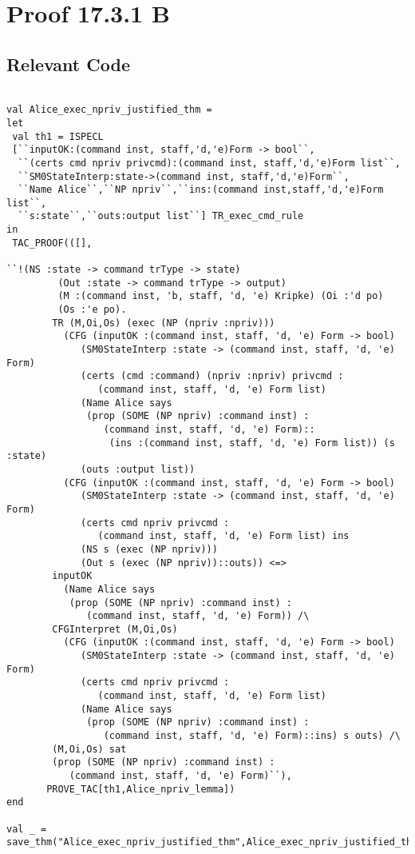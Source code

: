 \documentclass{report}
\begin{document}
\section{Proof 17.3.1 B}
\label{proof-2}

\subsection{Relevant Code}
\label{rel-code-2}
\begin{lstlisting}[frame=TBlr]

val Alice_exec_npriv_justified_thm =
let
 val th1 = ISPECL
 [``inputOK:(command inst, staff,'d,'e)Form -> bool``,
  ``(certs cmd npriv privcmd):(command inst, staff,'d,'e)Form list``,
  ``SM0StateInterp:state->(command inst, staff,'d,'e)Form``,
  ``Name Alice``,``NP npriv``,``ins:(command inst,staff,'d,'e)Form list``,
  ``s:state``,``outs:output list``] TR_exec_cmd_rule
in
 TAC_PROOF(([],

``!(NS :state -> command trType -> state)
         (Out :state -> command trType -> output)
         (M :(command inst, 'b, staff, 'd, 'e) Kripke) (Oi :'d po)
         (Os :'e po).
        TR (M,Oi,Os) (exec (NP (npriv :npriv)))
          (CFG (inputOK :(command inst, staff, 'd, 'e) Form -> bool)
             (SM0StateInterp :state -> (command inst, staff, 'd, 'e) Form)
             (certs (cmd :command) (npriv :npriv) privcmd :
                (command inst, staff, 'd, 'e) Form list)
             (Name Alice says
              (prop (SOME (NP npriv) :command inst) :
                 (command inst, staff, 'd, 'e) Form)::
                  (ins :(command inst, staff, 'd, 'e) Form list)) (s :state)
             (outs :output list))
          (CFG (inputOK :(command inst, staff, 'd, 'e) Form -> bool)
             (SM0StateInterp :state -> (command inst, staff, 'd, 'e) Form)
             (certs cmd npriv privcmd :
                (command inst, staff, 'd, 'e) Form list) ins
             (NS s (exec (NP npriv)))
             (Out s (exec (NP npriv))::outs)) <=>
        inputOK
          (Name Alice says
           (prop (SOME (NP npriv) :command inst) :
              (command inst, staff, 'd, 'e) Form)) /\
        CFGInterpret (M,Oi,Os)
          (CFG (inputOK :(command inst, staff, 'd, 'e) Form -> bool)
             (SM0StateInterp :state -> (command inst, staff, 'd, 'e) Form)
             (certs cmd npriv privcmd :
                (command inst, staff, 'd, 'e) Form list)
             (Name Alice says
              (prop (SOME (NP npriv) :command inst) :
                 (command inst, staff, 'd, 'e) Form)::ins) s outs) /\
        (M,Oi,Os) sat
        (prop (SOME (NP npriv) :command inst) :
           (command inst, staff, 'd, 'e) Form)``),
	   PROVE_TAC[th1,Alice_npriv_lemma])
end

val _ = save_thm("Alice_exec_npriv_justified_thm",Alice_exec_npriv_justified_thm)

\end{lstlisting}
\end{document}
